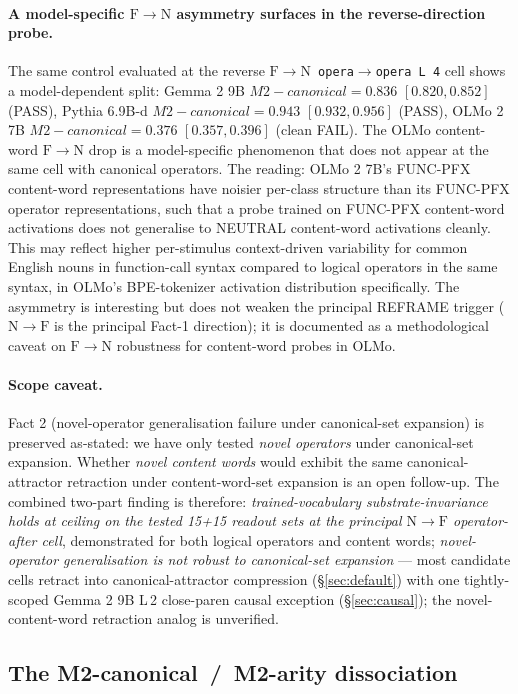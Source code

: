 \documentclass[11pt,letterpaper]{article}
\newcommand{\NtoF}{\ensuremath{\mathrm{N}\!\to\!\mathrm{F}}}
\newcommand{\FtoN}{\ensuremath{\mathrm{F}\!\to\!\mathrm{N}}}
\newcommand{\Mc}{M2-canonical}
\newcommand{\Ma}{M2-arity}
\begin{document}
\paragraph{A model-specific \FtoN{} asymmetry surfaces in the
reverse-direction probe.} The same control evaluated at the reverse
\texttt{\FtoN{} opera$\to$opera L\,4} cell shows a model-dependent
split: Gemma 2 9B $\Mc = 0.836$ $[0.820, 0.852]$ (PASS),
Pythia 6.9B-d $\Mc = 0.943$ $[0.932, 0.956]$ (PASS), OLMo 2 7B
$\Mc = 0.376$ $[0.357, 0.396]$ (clean FAIL). The OLMo content-word
\FtoN{} drop is a model-specific phenomenon that does not appear at
the same cell with canonical operators. The reading: OLMo 2 7B's
FUNC-PFX content-word representations have noisier per-class
structure than its FUNC-PFX operator representations, such that a
probe trained on FUNC-PFX content-word activations does not
generalise to NEUTRAL content-word activations cleanly. This may
reflect higher per-stimulus context-driven variability for common
English nouns in function-call syntax compared to logical operators
in the same syntax, in OLMo's BPE-tokenizer activation distribution
specifically. The asymmetry is interesting but does not weaken the
principal REFRAME trigger (\NtoF{} is the principal Fact-1
direction); it is documented as a methodological caveat on \FtoN{}
robustness for content-word probes in OLMo.

\paragraph{Scope caveat.} Fact 2 (novel-operator generalisation
failure under canonical-set expansion) is preserved as-stated: we
have only tested \emph{novel operators} under canonical-set
expansion. Whether \emph{novel content words} would exhibit the same
canonical-attractor retraction under content-word-set expansion is
an open follow-up. The combined two-part finding is therefore:
\emph{trained-vocabulary substrate-invariance holds at ceiling on
the tested 15+15 readout sets at the principal \NtoF{}
operator-after cell}, demonstrated for both logical operators and
content words; \emph{novel-operator generalisation is not robust to
canonical-set expansion} --- most candidate cells retract into
canonical-attractor compression (\S\ref{sec:default}) with one
tightly-scoped Gemma 2 9B L\,2 close-paren causal exception
(\S\ref{sec:causal}); the novel-content-word retraction analog is
unverified.

\subsection{The \Mc{}~/~\Ma{} dissociation}
\label{sec:dissoc}
\end{document}
